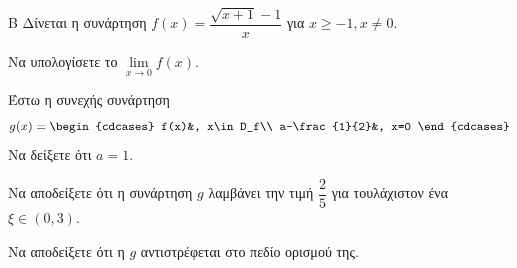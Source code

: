 \begin{thema}{Β}
Δίνεται η συνάρτηση $f(x) = \dfrac{\sqrt{x+1}-1}{x}$ για $x \ge -1, x \ne 0$.
\begin{erwthma}
\item Να υπολογίσετε το $\lim\limits_{x \to 0} f(x)$.
\item Έστω η συνεχής συνάρτηση
\[g(x)=\begin{cdcases}
f(x)&, x\in D_f\\ a-\frac{1}{2}&, x=0
\end{cdcases}\]
Να δείξετε ότι $a=1$.
\item Να αποδείξετε ότι η συνάρτηση $g$ λαμβάνει την τιμή $\dfrac{2}{5}$ για τουλάχιστον ένα $\xi \in (0, 3)$.
\item Να αποδείξετε ότι η $g$ αντιστρέφεται στο πεδίο ορισμού της.
\end{erwthma}
\end{thema}

